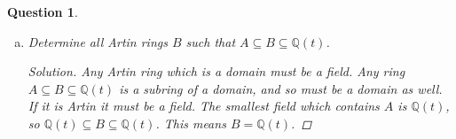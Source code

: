 \documentclass{article}
\newcommand{\Q}{\mathbb{Q}}
\newenvironment{solution}{\begin{proof}[Solution]\renewcommand\qedsymbol{}}{\end{proof}}
\newtheorem{question}{Question}
\theoremstyle{definition}
\begin{document}
\begin{question}
\begin{enumerate}[(a)]
\begin{solution}
                  The ring \(B\) is a valuation rings iff for all
                  \(\nicefrac{a}{b}\in Q(A)\) either \(\nicefrac{a}{b}\in B\) or
                  \(\nicefrac{b}{a}\in B\). By assuming that \(a,b\in\Q[t]\) are
                  coprime then this means that \(a\in S\) or \(b\in S\). In
                  particular this holds for irreducible polynomials. This means
                  that at most one irreducible polynomial up to multiplication
                  with a constant cannot be in the set \(S\). This means that
                  \(\Q[t]\setminus S\subseteq(f)\) for some irreducible
                  polynomial \(f\).

                  Conversely if \(\Q[t]\setminus S\subseteq(f)\) for some
                  irreducible \(f\) then \(B=S^{-1}\Q[t]\) is a valuation ring.
                  This is because for all \(\nicefrac{a}{b}\in\Q(t)\) with
                  \(a,b\) coprime we know \(f\) divides at most one of \(a,b\)
                  so either \(a\in S\) or \(b\in S\). This means that
                  \(\nicefrac{a}{b}\in B\) or \(\nicefrac{b}{a}\in B\)
                  so it is a valuation ring.

                  This means \(B=S^{-1}A\) is a valuation ring iff
                  \(\Q[t]\setminus S\subseteq (f)\) for some irreducible \(f\).
              \end{solution}

        \item Determine all Artin rings \(B\) such that \(A\subseteq
              B\subseteq\Q(t)\).

              \begin{solution}
                  Any Artin ring which is a domain must be a field. Any ring
                  \(A\subseteq B\subseteq\Q(t)\) is a subring of a domain, and
                  so must be a domain as well. If it is Artin it must be a
                  field. The smallest field which contains \(A\) is \(\Q(t)\),
                  so \(\Q(t)\subseteq B\subseteq\Q(t)\). This means \(B=\Q(t)\).
              \end{solution}
    \end{enumerate}
\end{question}
\end{document}
